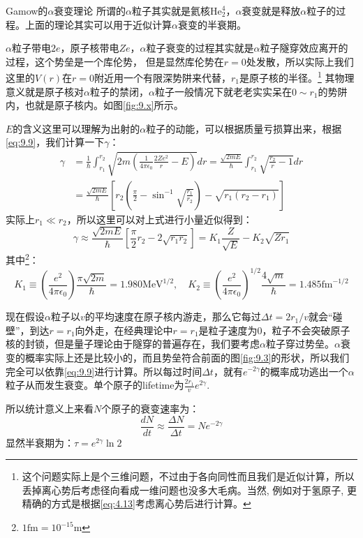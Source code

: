 \documentclass[a4paper,zihao=-4,linespread=1]{ctexrep}
\begin{document}
    \begin{example}{Gamow的$\alpha$衰变理论}
        所谓的$\alpha$粒子其实就是氦核$\mathrm{He}_{2}^{4}$，$\alpha$衰变就是释放$\alpha$粒子的过程。上面的理论其实可以用于近似计算$\alpha$衰变的半衰期。

        \setlength\parindent{2em}$\alpha$粒子带电$2e$，原子核带电$Ze$，$\alpha$粒子衰变的过程其实就是$\alpha$粒子隧穿效应离开的过程，这个势垒是一个库伦势，
        但是显然库伦势在$r=0$处发散，所以实际上我们这里的$V(r)$在$r=0$附近用一个有限深势阱来代替，$r_1$是原子核的半径。\footnote{这个问题实际上是个三维问题，不过由于各向同性而且我们是近似计算，所以丢掉离心势后考虑径向看成一维问题也没多大毛病。当然, 例如对于氢原子, 更精确的方式是根据\ref{eq:4.13}考虑离心势后进行计算。}
        其物理意义就是原子核对$\alpha$粒子的禁闭，$\alpha$粒子一般情况下就老老实实呆在$0\sim r_1$的势阱内，也就是原子核内。如图\ref{fig:9.x}所示。

        \setlength\parindent{2em}$E$的含义这里可以理解为出射的$\alpha$粒子的动能，可以根据质量亏损算出来，根据\ref{eq:9.9}，我们计算一下$\gamma$：
        \begin{align*}
            \gamma&=\frac{1}{\hbar} \int_{r_1}^{r_2} \sqrt{2 m\left(\frac{1}{4 \pi \epsilon_0} \frac{2 Z e^2}{r}-E\right)} d r=\frac{\sqrt{2 m E}}{\hbar} \int_{r_1}^{r_2} \sqrt{\frac{r_2}{r}-1} d r\\
            &=\frac{\sqrt{2 m E}}{\hbar}\left[r_2\left(\frac{\pi}{2}-\sin ^{-1} \sqrt{\frac{r_1}{r_2}}\right)-\sqrt{r_1\left(r_2-r_1\right)}\right]
        \end{align*}
        实际上$r_1\ll r_2$，所以这里可以对上式进行小量近似得到：
        \[\gamma \approx \frac{\sqrt{2 m E}}{\hbar}\left[\frac{\pi}{2} r_2-2 \sqrt{r_1 r_2}\right]=K_1 \frac{Z}{\sqrt{E}}-K_2 \sqrt{Z r_1}\]
        其中\footnote{$1\mathrm{fm}=10^{-15}\mathrm{m}$}：
        \[K_1 \equiv\left(\frac{e^2}{4 \pi \epsilon_0}\right) \frac{\pi \sqrt{2 m}}{\hbar}=1.980 \mathrm{MeV}^{1 / 2},\quad K_2 \equiv\left(\frac{e^2}{4 \pi \epsilon_0}\right)^{1 / 2} \frac{4 \sqrt{m}}{\hbar}=1.485 \mathrm{fm}^{-1 / 2}\]
    
        \setlength\parindent{2em}现在假设$\alpha$粒子以$v$的平均速度在原子核内游走，那么它每过$\Delta t=2r_1/v$就会“碰壁”，到达$r=r_1$向外走，在经典理论中$r=r_1$是粒子速度为0，粒子不会突破原子
        核的封锁，但是量子理论由于隧穿的普遍存在，我们要考虑$\alpha$粒子穿过势垒。$\alpha$衰变的概率实际上还是比较小的，而且势垒符合前面的图\ref{fig:9.3}的形状，所以我们
        完全可以依靠\ref{eq:9.9}进行计算。所以每过时间$\Delta t$，就有$e^{-2\gamma}$的概率成功逃出一个$\alpha$粒子从而发生衰变。单个原子的lifetime为$\frac{2r_1}{v}e^{2\gamma}$.
        
        \setlength\parindent{2em}所以统计意义上来看$N$个原子的衰变速率为：
        \[\frac{dN}{dt}\approx\frac{\Delta N}{\Delta t}=Ne^{-2\gamma}\]
        显然半衰期为：$\tau=e^{2\gamma}\ln 2$
    \end{example}
\end{document}
